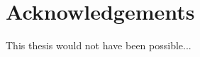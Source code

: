 \chapter*{Acknowledgements}
\label{ch:acknowledgements}

This thesis would not have been possible...